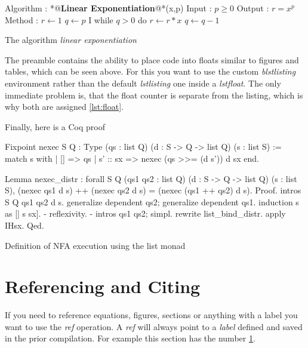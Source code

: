 \documentclass[english]{article}
\begin{document}
\begin{lstfloat}
  \centering
  
  \begin{blstlisting}[firstnumber=1]
  Algorithm : *@\textbf{Linear Exponentiation}@*(x,p)
  Input     : $p \geq 0$
  Output    : $r = x^p$
  Method    : $r \leftarrow 1$
              $q \leftarrow p$
              {I} while $q > 0$ do
                  $r \leftarrow r * x$
                  $q \leftarrow q - 1$
  \end{blstlisting}

  \caption{The algorithm \emph{linear exponentiation}}
  \label{lst:float}
\end{lstfloat}

The preamble contains the ability to place code into floats similar to
figures and tables, which can be seen above. For this you want to use the custom
\emph{blstlisting} environment rather than the default \emph{lstlisting} one
inside a \emph{lstfloat}. The only immediate problem is, that the float counter
is separate from the listing, which is why both are assigned \ref{lst:float}.

Finally, here is a Coq proof

\begin{lstfloat}[ht!]
  \centering

  \begin{blstlisting}[language=coq]
  Fixpoint nexec {S Q : Type}
                 (qs : list Q) (d : S -> Q -> list Q) (s : list S) :=
    match s with
    | []       => qs
    | s' :: sx => nexec (qs >>= (d s')) d sx
    end.

  Lemma nexec_distr :
    forall {S Q} (qs1 qs2 : list Q)
                 (d : S -> Q -> list Q) (s : list S),
      (nexec qs1 d s) ++ (nexec qs2 d s) = (nexec (qs1 ++ qs2) d s).
  Proof.
    intros S Q qs1 qs2 d s.
    generalize dependent qs2; generalize dependent qs1.
    induction s as [| s sx].
    - reflexivity.
    - intros qs1 qs2; simpl. rewrite list_bind_distr. apply IHsx.
  Qed.
  \end{blstlisting}

  \caption{Definition of NFA execution using the list monad}
\end{lstfloat}

\section{Referencing and Citing} \label{sec:ref}
If you need to reference equations, figures, sections or anything with a label
you want to use the \emph{ref} operation. A \emph{ref} will always point to a
\emph{label} defined and saved in the prior compilation. For example this
section has the number \ref{sec:ref}.
\end{document}
